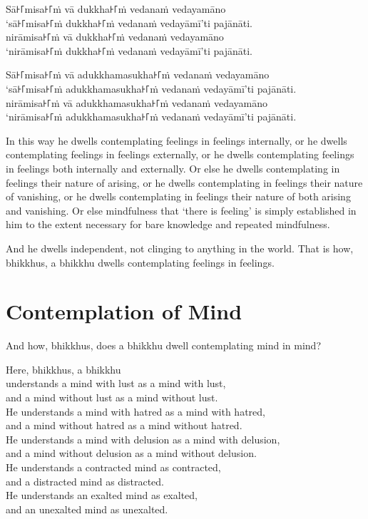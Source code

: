 Sā꜔꜒misa꜔꜒ṁ vā dukkha꜔꜒ṁ vedanaṁ vedayamāno\\
‘sā꜔꜒misa꜔꜒ṁ dukkha꜔꜒ṁ vedanaṁ vedayāmī’ti pajānāti.\\
nirāmisa꜔꜒ṁ vā dukkha꜔꜒ṁ vedanaṁ vedayamāno\\
‘nirāmisa꜔꜒ṁ dukkha꜔꜒ṁ vedanaṁ vedayāmī’ti pajānāti.

Sā꜔꜒misa꜔꜒ṁ vā adukkhamasukha꜔꜒ṁ vedanaṁ vedayamāno\\
‘sā꜔꜒misa꜔꜒ṁ adukkhamasukha꜔꜒ṁ vedanaṁ vedayāmī’ti pajānāti.\\
nirāmisa꜔꜒ṁ vā adukkhamasukha꜔꜒ṁ vedanaṁ vedayamāno\\
‘nirāmisa꜔꜒ṁ adukkhamasukha꜔꜒ṁ vedanaṁ vedayāmī’ti pajānāti.

\englishPage

In this way he dwells contemplating feelings in feelings internally, or he
dwells contemplating feelings in feelings externally, or he dwells contemplating
feelings in feelings both internally and externally. Or else he dwells
contemplating in feelings their nature of arising, or he dwells contemplating in
feelings their nature of vanishing, or he dwells contemplating in feelings their
nature of both arising and vanishing. Or else mindfulness that ‘there is
feeling’ is simply established in him to the extent necessary for bare knowledge
and repeated mindfulness.

And he dwells independent, not clinging to anything in the world. That is how,
bhikkhus, a bhikkhu dwells contemplating feelings in feelings.


\chapter{Contemplation of Mind}

And how, bhikkhus, does a bhikkhu dwell contemplating mind in mind?

Here, bhikkhus, a bhikkhu\\
understands a mind with lust as a mind with lust,\\
and a mind without lust as a mind without lust.\\
He understands a mind with hatred as a mind with hatred,\\
and a mind without hatred as a mind without hatred.\\
He understands a mind with delusion as a mind with delusion,\\
and a mind without delusion as a mind without delusion.\\
He understands a contracted mind as contracted,\\
and a distracted mind as distracted.\\
He understands an exalted mind as exalted,\\
and an unexalted mind as unexalted.

